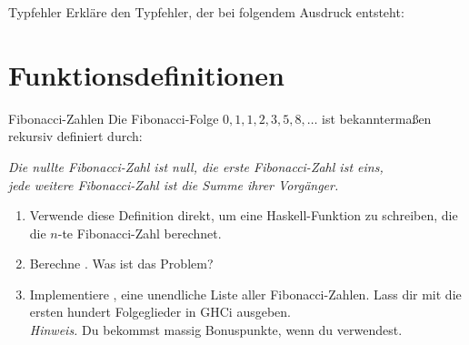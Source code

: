 \documentclass{uebblatt}
\begin{document}
\begin{aufgabe}{Typfehler}
  Erkläre den Typfehler, der bei folgendem Ausdruck entsteht: 
\end{aufgabe}

\section{Funktionsdefinitionen}

\begin{aufgabe}{Fibonacci-Zahlen}
  Die Fibonacci-Folge $0, 1, 1, 2, 3, 5, 8, \ldots$ ist bekanntermaßen rekursiv definiert durch:
  \begin{center}
    \emph{Die nullte Fibonacci-Zahl ist null, die erste Fibonacci-Zahl ist eins, \\
    jede weitere Fibonacci-Zahl ist die Summe ihrer Vorgänger.}
  \end{center}
  \begin{enumerate}
    \item Verwende diese Definition direkt, um eine Haskell-Funktion  zu schreiben, die die $n$-te Fibonacci-Zahl berechnet.
    \item Berechne . Was ist das Problem?
    \item Implementiere , eine unendliche Liste aller Fibonacci-Zahlen. Lass dir mit  die ersten hundert Folgeglieder in GHCi ausgeben. \\
    {\scriptsize \emph{Hinweis.} Du bekommst massig Bonuspunkte, wenn du  verwendest.}
  \end{enumerate}
\end{aufgabe}
\end{document}

